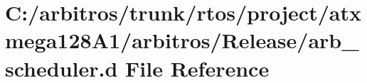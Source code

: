 \hypertarget{rtos_2project_2atxmega128_a1_2arbitros_2_release_2arb__scheduler_8d}{\section{C\-:/arbitros/trunk/rtos/project/atxmega128\-A1/arbitros/\-Release/arb\-\_\-scheduler.d File Reference}
\label{rtos_2project_2atxmega128_a1_2arbitros_2_release_2arb__scheduler_8d}
}
